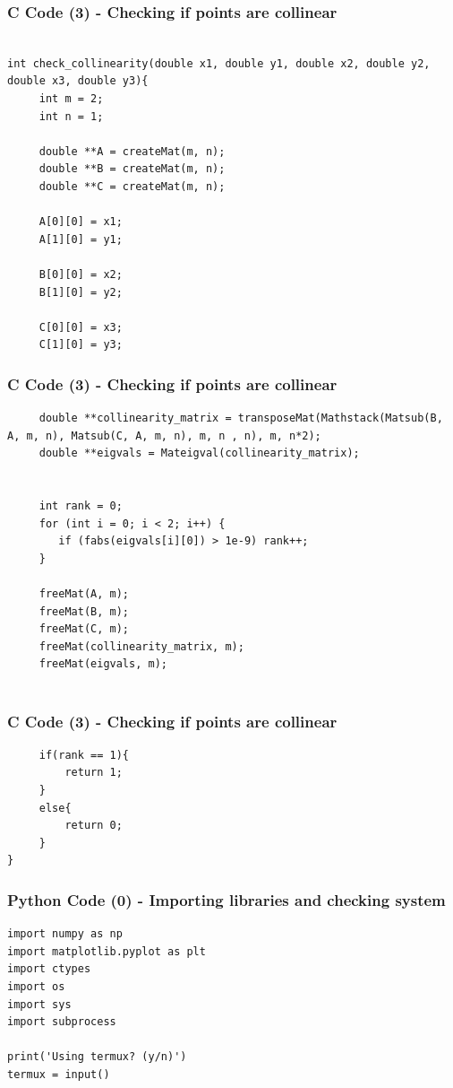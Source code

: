 \documentclass{beamer}
\begin{document}
\begin{frame}[fragile]
    \frametitle{C Code (3) - Checking if points are collinear}

    \begin{lstlisting}

int check_collinearity(double x1, double y1, double x2, double y2, double x3, double y3){
     int m = 2;
     int n = 1;

     double **A = createMat(m, n);
     double **B = createMat(m, n);
     double **C = createMat(m, n);

     A[0][0] = x1;
     A[1][0] = y1;

     B[0][0] = x2;
     B[1][0] = y2;

     C[0][0] = x3;
     C[1][0] = y3;

    \end{lstlisting}
\end{frame}


\begin{frame}[fragile]
    \frametitle{C Code (3) - Checking if points are collinear}

    \begin{lstlisting}
     double **collinearity_matrix = transposeMat(Mathstack(Matsub(B, A, m, n), Matsub(C, A, m, n), m, n , n), m, n*2);
     double **eigvals = Mateigval(collinearity_matrix);


     int rank = 0;
     for (int i = 0; i < 2; i++) {
        if (fabs(eigvals[i][0]) > 1e-9) rank++;
     }

     freeMat(A, m);
     freeMat(B, m);
     freeMat(C, m);
     freeMat(collinearity_matrix, m);
     freeMat(eigvals, m);


\end{lstlisting}
\end{frame}

\begin{frame}[fragile]
    \frametitle{C Code (3) - Checking if points are collinear}

    \begin{lstlisting}
     if(rank == 1){
         return 1;
     }
     else{
         return 0;
     }
}
    \end{lstlisting}
\end{frame}

\begin{frame}[fragile]
    \frametitle{Python Code (0) - Importing libraries and checking system}
    \begin{lstlisting}
import numpy as np
import matplotlib.pyplot as plt
import ctypes
import os
import sys
import subprocess

print('Using termux? (y/n)')
termux = input()
\end{lstlisting}
\end{frame}
\end{document}
